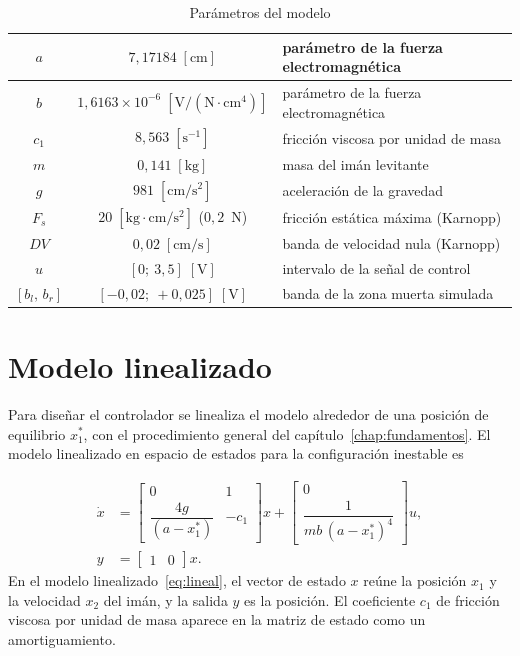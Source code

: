 \begin{table}[ht]
\centering
\caption{Parámetros del modelo}
\label{tab:parametros}
\begin{tabular}{|c|c|l|}
\hline
$a$ & $7{,}17184\;[\text{cm}]$ & parámetro de la fuerza electromagnética \\ \hline
$b$ & $1{,}6163 \times 10^{-6}\;[\text{V}/(\text{N}\cdot\text{cm}^4)]$ & parámetro de la fuerza electromagnética \\ \hline
$c_1$ & $8{,}563\;[\text{s}^{-1}]$ & fricción viscosa por unidad de masa \\ \hline
$m$ & $0{,}141\;[\text{kg}]$ & masa del imán levitante \\ \hline
$g$ & $981\;[\text{cm}/\text{s}^2]$ & aceleración de la gravedad \\ \hline
$F_s$ & $20\;[\text{kg}\cdot\text{cm}/\text{s}^2]$ ($0{,}2$~N) & fricción estática máxima (Karnopp) \\ \hline
$DV$ & $0{,}02\;[\text{cm}/\text{s}]$ & banda de velocidad nula (Karnopp) \\ \hline
$u$ & $[0;\ 3{,}5]\;[\text{V}]$ & intervalo de la señal de control \\ \hline
$[b_l,\,b_r]$ & $[-0{,}02;\ +0{,}025]\;[\text{V}]$ & banda de la zona muerta simulada \\ \hline
\end{tabular}
\end{table}

\section{Modelo linealizado}\label{sec:linealizado}

Para diseñar el controlador se linealiza el modelo alrededor de una posición de equilibrio $x_1^{\ast}$, con el procedimiento general del capítulo~\ref{chap:fundamentos}. El modelo linealizado en espacio de estados para la configuración inestable es

\begin{equation}
\begin{aligned}
\dot{x}
&=
\begin{bmatrix}
0 & 1 \\[6pt]
\dfrac{4g}{(a-x_1^{\ast})} & -c_1
\end{bmatrix}x
+
\begin{bmatrix}
0 \\[6pt]
\dfrac{1}{mb\,(a-x_1^{\ast})^4}
\end{bmatrix}u,
\\[10pt]
y &= \begin{bmatrix} 1 & 0 \end{bmatrix} x .
\end{aligned}
\label{eq:lineal}
\end{equation}
En el modelo linealizado~\eqref{eq:lineal}, el vector de estado $x$ reúne la posición $x_1$ y la velocidad $x_2$ del imán, y la salida $y$ es la posición. El coeficiente $c_1$ de fricción viscosa por unidad de masa aparece en la matriz de estado como un amortiguamiento.

